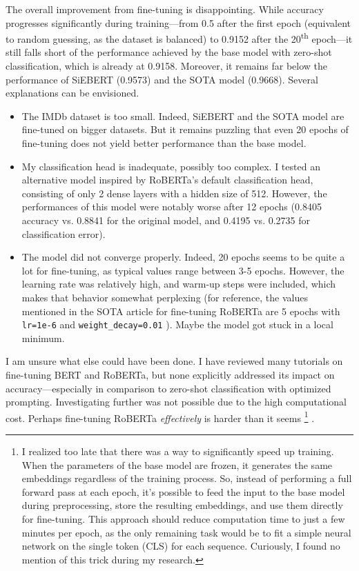 \documentclass{article}
\begin{document}
The overall improvement from fine-tuning is disappointing. While accuracy progresses significantly during training—from 0.5 after the first epoch (equivalent to random guessing, as the dataset is balanced) to 0.9152 after the 20\textsuperscript{th} epoch—it still falls short of the performance achieved by the base model with zero-shot classification, which is already at 0.9158. Moreover, it remains far below the performance of SiEBERT (0.9573) and the SOTA model (0.9668). Several explanations can be envisioned.
\begin{itemize}
    \item The IMDb dataset is too small. Indeed, SiEBERT and the SOTA model are fine-tuned on bigger datasets. But it remains puzzling that even 20 epochs of fine-tuning does not yield better performance than the base model.
    \item My classification head is inadequate, possibly too complex. I tested an alternative model inspired by RoBERTa’s default classification head, consisting of only 2 dense layers with a hidden size of 512. However, the performances of this model were notably worse after 12 epochs (0.8405 accuracy vs. 0.8841 for the original model, and 0.4195 vs. 0.2735 for classification error).
    \item The model did not converge properly. Indeed, 20 epochs seems to be quite a lot for fine-tuning, as typical values range between 3-5 epochs. However, the learning rate was relatively high, and warm-up steps were included, which makes that behavior somewhat perplexing (for reference, the values mentioned in the SOTA article for fine-tuning RoBERTa are 5 epochs with \texttt{lr=1e-6} and \texttt{weight\_decay=0.01} \citep{csanady_llambert_2024}). Maybe the model got stuck in a local minimum.
\end{itemize}

I am unsure what else could have been done. I have reviewed many tutorials on fine-tuning BERT and RoBERTa, but none explicitly addressed its impact on accuracy---especially in comparison to zero-shot classification with optimized prompting. Investigating further was not possible due to the high computational cost. Perhaps fine-tuning RoBERTa \textit{effectively} is harder than it seems 
\footnote{I realized too late that there was a way to significantly speed up training. When the parameters of the base model are frozen, it generates the same embeddings regardless of the training process. So, instead of performing a full forward pass at each epoch, it's possible to feed the input to the base model during preprocessing, store the resulting embeddings, and use them directly for fine-tuning. This approach should reduce computation time to just a few minutes per epoch, as the only remaining task would be to fit a simple neural network on the single token (CLS) for each sequence. Curiously, I found no mention of this trick during my research.}
.
\end{document}

